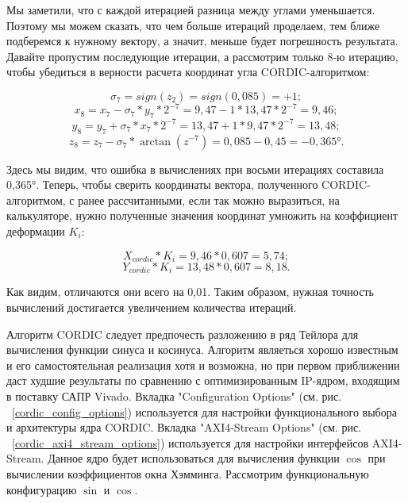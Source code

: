 \documentclass[a4paper,oneside ,10pt]{extreport}
\begin{document}
Мы заметили, что с каждой итерацией разница между углами уменьшается. Поэтому 
мы можем сказать, что чем больше итераций 
проделаем, тем ближе подберемся к нужному 
вектору, а значит, меньше будет погрешность 
результата.
Давайте пропустим последующие итерации, а рассмотрим только 8‑ю итерацию, 
чтобы убедиться в верности расчета координат угла CORDIC-алгоритмом:

\begin{displaymath}	
\sigma_7 = sign(z_2) = sign(0,085) = + 1;
\end{displaymath}
\begin{displaymath}	
x_{8} = x_{7} - \sigma_7*y_7*2^{-7} = 9,47 - 1*13,47*2^{-7} = 9,46;
\end{displaymath}
\begin{displaymath}
y_{8} = y_{7} + \sigma_7*x_7*2^{-7} = 13,47 + 1*9,47*2^{-7} = 13,48;
\end{displaymath}
\begin{displaymath}	
z_{8} = z_{7} - \sigma_7*\arctan(z^{-7}) = 0,085 - 0,45 = -0,365°.
\end{displaymath}

Здесь мы видим, что ошибка в вычислениях при восьми итерациях составила 0,365°.
Теперь, чтобы сверить координаты вектора, полученного CORDIC-алгоритмом, с ранее рассчитанными, если так можно выразиться, на калькуляторе, нужно полученные значения координат умножить на коэффициент деформации \(K_i\):

\begin{displaymath}
X_{cordic} * K_i = 9,46*0,607 = 5,74;
\end{displaymath}
\begin{displaymath}	
Y_{cordic} * K_i= 13,48 * 0,607 = 8,18.
\end{displaymath}

Как видим, отличаются они всего на 0,01. Таким образом, нужная точность вычислений 
достигается увеличением количества итераций.

Алгоритм CORDIC следует предпочесть разложению в ряд Тейлора для вычисления функции синуса и косинуса. Алгоритм являеться хорошо известным и его самостоятельная реализация хотя и возможна, но при первом приближении даст худшие результаты по сравнению с оптимизированным IP-ядром, входящим в поставку САПР Vivado. Вкладка "Configuration Options" (см. рис. ~\ref{cordic_config_options}) используется для настройки функционального выбора и архитектуры ядра CORDIC. Вкладка "AXI4-Stream Options" (см. рис. ~\ref{cordic_axi4_stream_options}) используется для настройки интерфейсов AXI4-Stream. Данное ядро будет использоваться для вычисления функции \(\cos\) при вычислении коэффициентов окна Хэмминга. Рассмотрим функциональную конфигурацию \(\sin\) и \(\cos\).
\end{document}
